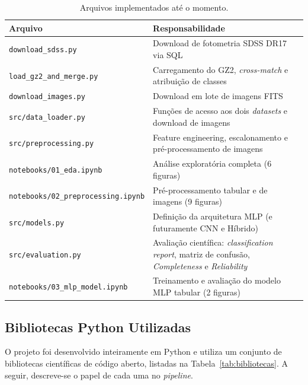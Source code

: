 \documentclass[12pt, a4paper]{article}
\begin{document}
\begin{table}[H]
  \centering
  \caption{Arquivos implementados até o momento.}
  \label{tab:estrutura}
  \begin{tabular}{lp{9cm}}
    \toprule
    \textbf{Arquivo} & \textbf{Responsabilidade} \\
    \midrule
    \texttt{download\_sdss.py}       & Download de fotometria SDSS DR17 via SQL \\
    \texttt{load\_gz2\_and\_merge.py} & Carregamento do GZ2, \textit{cross-match} e atribuição de classes \\
    \texttt{download\_images.py}     & Download em lote de imagens FITS \\
    \texttt{src/data\_loader.py}     & Funções de acesso aos dois \textit{datasets} e download de imagens \\
    \texttt{src/preprocessing.py}   & Feature engineering, escalonamento e pré-processamento de imagens \\
    \texttt{notebooks/01\_eda.ipynb} & Análise exploratória completa (6 figuras) \\
    \texttt{notebooks/02\_preprocessing.ipynb} & Pré-processamento tabular e de imagens (9 figuras) \\
    \texttt{src/models.py}               & Definição da arquitetura MLP (e futuramente CNN e Híbrido) \\
    \texttt{src/evaluation.py}           & Avaliação científica: \textit{classification report}, matriz de confusão, \textit{Completeness} e \textit{Reliability} \\
    \texttt{notebooks/03\_mlp\_model.ipynb} & Treinamento e avaliação do modelo MLP tabular (2 figuras) \\
    \bottomrule
  \end{tabular}
\end{table}

\subsection{Bibliotecas Python Utilizadas}

O projeto foi desenvolvido inteiramente em Python e utiliza um conjunto de
bibliotecas científicas de código aberto, listadas na
Tabela~\ref{tab:bibliotecas}. A seguir, descreve-se o papel de cada uma no
\textit{pipeline}.
\end{document}
